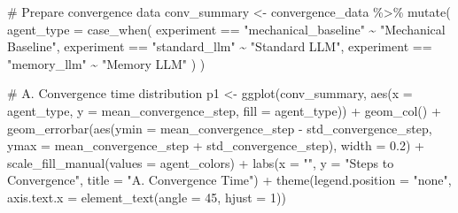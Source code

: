 \documentclass[
  11pt,
]{article}
\newenvironment{Shaded}{\begin{snugshade}}{\end{snugshade}}
\newcommand{\AttributeTok}[1]{\textcolor[rgb]{0.40,0.45,0.13}{#1}}
\newcommand{\CommentTok}[1]{\textcolor[rgb]{0.37,0.37,0.37}{#1}}
\newcommand{\DecValTok}[1]{\textcolor[rgb]{0.68,0.00,0.00}{#1}}
\newcommand{\FloatTok}[1]{\textcolor[rgb]{0.68,0.00,0.00}{#1}}
\newcommand{\FunctionTok}[1]{\textcolor[rgb]{0.28,0.35,0.67}{#1}}
\newcommand{\NormalTok}[1]{\textcolor[rgb]{0.00,0.23,0.31}{#1}}
\newcommand{\OtherTok}[1]{\textcolor[rgb]{0.00,0.23,0.31}{#1}}
\newcommand{\SpecialCharTok}[1]{\textcolor[rgb]{0.37,0.37,0.37}{#1}}
\newcommand{\StringTok}[1]{\textcolor[rgb]{0.13,0.47,0.30}{#1}}
\begin{document}
\begin{Shaded}
\begin{Highlighting}[]
\CommentTok{\# Prepare convergence data}
\NormalTok{conv\_summary }\OtherTok{\textless{}{-}}\NormalTok{ convergence\_data }\SpecialCharTok{\%\textgreater{}\%}
  \FunctionTok{mutate}\NormalTok{(}
    \AttributeTok{agent\_type =} \FunctionTok{case\_when}\NormalTok{(}
\NormalTok{      experiment }\SpecialCharTok{==} \StringTok{"mechanical\_baseline"} \SpecialCharTok{\textasciitilde{}} \StringTok{"Mechanical Baseline"}\NormalTok{,}
\NormalTok{      experiment }\SpecialCharTok{==} \StringTok{"standard\_llm"} \SpecialCharTok{\textasciitilde{}} \StringTok{"Standard LLM"}\NormalTok{,}
\NormalTok{      experiment }\SpecialCharTok{==} \StringTok{"memory\_llm"} \SpecialCharTok{\textasciitilde{}} \StringTok{"Memory LLM"}
\NormalTok{    )}
\NormalTok{  )}

\CommentTok{\# A. Convergence time distribution}
\NormalTok{p1 }\OtherTok{\textless{}{-}} \FunctionTok{ggplot}\NormalTok{(conv\_summary, }\FunctionTok{aes}\NormalTok{(}\AttributeTok{x =}\NormalTok{ agent\_type, }\AttributeTok{y =}\NormalTok{ mean\_convergence\_step, }\AttributeTok{fill =}\NormalTok{ agent\_type)) }\SpecialCharTok{+}
  \FunctionTok{geom\_col}\NormalTok{() }\SpecialCharTok{+}
  \FunctionTok{geom\_errorbar}\NormalTok{(}\FunctionTok{aes}\NormalTok{(}\AttributeTok{ymin =}\NormalTok{ mean\_convergence\_step }\SpecialCharTok{{-}}\NormalTok{ std\_convergence\_step,}
                    \AttributeTok{ymax =}\NormalTok{ mean\_convergence\_step }\SpecialCharTok{+}\NormalTok{ std\_convergence\_step),}
                \AttributeTok{width =} \FloatTok{0.2}\NormalTok{) }\SpecialCharTok{+}
  \FunctionTok{scale\_fill\_manual}\NormalTok{(}\AttributeTok{values =}\NormalTok{ agent\_colors) }\SpecialCharTok{+}
  \FunctionTok{labs}\NormalTok{(}\AttributeTok{x =} \StringTok{""}\NormalTok{, }\AttributeTok{y =} \StringTok{"Steps to Convergence"}\NormalTok{, }\AttributeTok{title =} \StringTok{"A. Convergence Time"}\NormalTok{) }\SpecialCharTok{+}
  \FunctionTok{theme}\NormalTok{(}\AttributeTok{legend.position =} \StringTok{"none"}\NormalTok{, }\AttributeTok{axis.text.x =} \FunctionTok{element\_text}\NormalTok{(}\AttributeTok{angle =} \DecValTok{45}\NormalTok{, }\AttributeTok{hjust =} \DecValTok{1}\NormalTok{))}


\end{Highlighting}
\end{Shaded}
\end{document}
